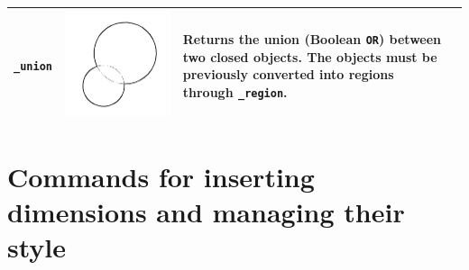 \documentclass[..]{../IEEEphot}
\begin{document}
\begin{center}
\begin{longtable}{m{.2\linewidth}m{.2\linewidth}m{.25\linewidth}m{.25\linewidth}}
\texttt{\_union} & \includegraphics[width = 0.8\linewidth, keepaspectratio]{../images/jpg/_union.jpg} & Returns the union (Boolean \texttt{OR}) between two closed objects. The objects must be previously converted into regions through \texttt{\_region}. & 
\\
\bottomrule
\end{longtable}
\end{center}

\clearpage

\section{Commands for inserting dimensions and managing their style}
\end{document}
